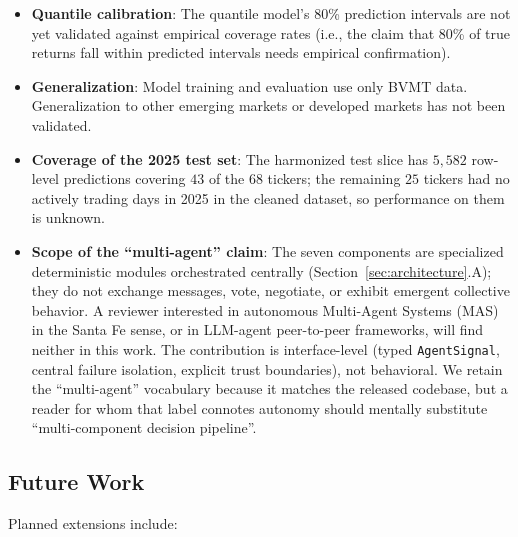 \documentclass[conference]{IEEEtran}
\begin{document}
\begin{itemize}
\item \textbf{Quantile calibration}: The quantile model's 80\% prediction intervals are not yet validated against empirical coverage rates (i.e., the claim that 80\% of true returns fall within predicted intervals needs empirical confirmation).

\item \textbf{Generalization}: Model training and evaluation use only BVMT data. Generalization to other emerging markets or developed markets has not been validated.

\item \textbf{Coverage of the 2025 test set}: The harmonized test slice has $5{,}582$ row-level predictions covering $43$ of the $68$ tickers; the remaining $25$ tickers had no actively trading days in 2025 in the cleaned dataset, so performance on them is unknown.

\item \textbf{Scope of the ``multi-agent'' claim}: The seven components are specialized deterministic modules orchestrated centrally (Section~\ref{sec:architecture}.A); they do not exchange messages, vote, negotiate, or exhibit emergent collective behavior. A reviewer interested in autonomous Multi-Agent Systems (MAS) in the Santa Fe sense, or in LLM-agent peer-to-peer frameworks, will find neither in this work. The contribution is interface-level (typed \texttt{AgentSignal}, central failure isolation, explicit trust boundaries), not behavioral. We retain the ``multi-agent'' vocabulary because it matches the released codebase, but a reader for whom that label connotes autonomy should mentally substitute ``multi-component decision pipeline''.
\end{itemize}

\subsection{Future Work}\label{sec:future_work}

Planned extensions include:
\end{document}
